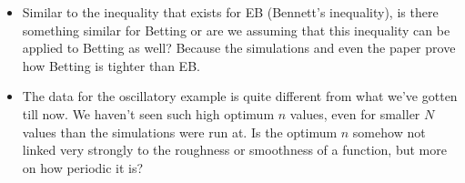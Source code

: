 \documentclass{amsart}
\begin{document}
\begin{itemize}
\begin{itemize}
        \item Similar to the inequality that exists for EB (Bennett’s inequality), is there something similar for Betting or are we assuming that this inequality can be applied to Betting as well? Because the simulations and even the paper prove how Betting is tighter than EB. 
        \item The data for the oscillatory example is quite different from what we've gotten till now. We haven't seen such high optimum $n$ values, even for smaller $N$ values than the simulations were run at. Is the optimum $n$ somehow not linked very strongly to the roughness or smoothness of a function, but more on how periodic it is? 
    \end{itemize}
\end{itemize}




\end{document}
